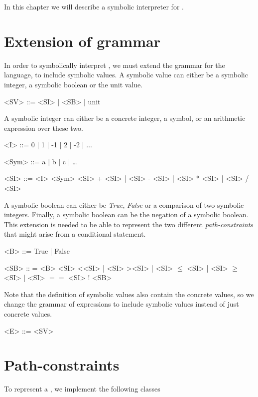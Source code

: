 In this chapter we will describe a symbolic interpreter for \explanguage. 

\section{Extension of grammar}

In order to symbolically interpret \explanguage, we must extend the grammar for the language, to include symbolic values. A symbolic value can either be a symbolic integer, a symbolic boolean or the unit value. 

\begin{grammar}
	<SV> ::= <SI> | <SB> | unit
\end{grammar}

A symbolic integer can either be a concrete integer, a symbol, or an arithmetic expression over these two.

\begin{grammar}
	<I> ::= 0 | 1 | -1 | 2 | -2 | $\ldots$
	
	<Sym> ::= a | b | c | \ldots
	
	<SI> ::= <I>
	\alt <Sym>	
	\alt <SI> + <SI> | <SI> - <SI> | <SI> * <SI> | <SI> / <SI>  
\end{grammar}

A symbolic boolean can either be \textsl{True}, \textsl{False} or a comparison of two symbolic integers. Finally, a symbolic boolean can be the negation of a symbolic boolean. This extension is needed to be able to represent the two different \emph{path-constraints} that might arise from a conditional statement.

\begin{grammar}
	<B> ::= True | False 
	
	<SB> :: = <B>
	\alt <SI> \textless <SI> | <SI> \textgreater <SI> | <SI> $\leq$ <SI> | <SI> $\geq$ <SI> | <SI> $==$ <SI>
	\alt ! <SB>
\end{grammar} 

Note that the definition of symbolic values also contain the concrete values, so we change the grammar of expressions to include symbolic values instead of just concrete values.

\begin{grammar}
	<E> ::= <SV>
\end{grammar}

\section{Path-constraints}
To represent a \pc, we implement the following classes

